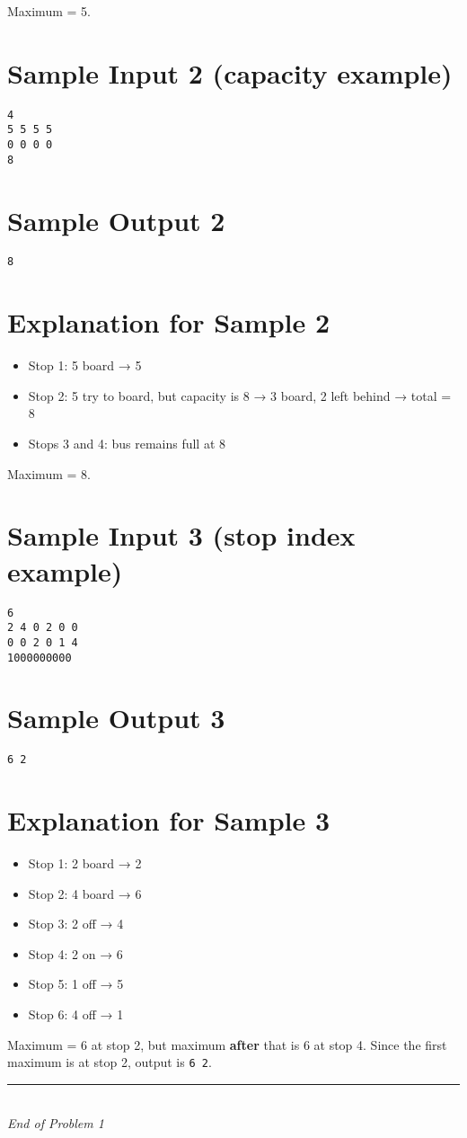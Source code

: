 \documentclass[12pt,a4paper]{article}
\begin{document}
Maximum = 5.

\section*{Sample Input 2 (capacity example)}
\begin{verbatim}
4
5 5 5 5
0 0 0 0
8
\end{verbatim}

\section*{Sample Output 2}
\begin{verbatim}
8
\end{verbatim}

\section*{Explanation for Sample 2}
\begin{itemize}
  \item Stop 1: 5 board → 5  
  \item Stop 2: 5 try to board, but capacity is 8 → 3 board, 2 left behind → total = 8  
  \item Stops 3 and 4: bus remains full at 8  
\end{itemize}

Maximum = 8.

\section*{Sample Input 3 (stop index example)}
\begin{verbatim}
6
2 4 0 2 0 0
0 0 2 0 1 4
1000000000
\end{verbatim}

\section*{Sample Output 3}
\begin{verbatim}
6 2
\end{verbatim}

\section*{Explanation for Sample 3}
\begin{itemize}
  \item Stop 1: 2 board → 2  
  \item Stop 2: 4 board → 6  
  \item Stop 3: 2 off → 4  
  \item Stop 4: 2 on → 6  
  \item Stop 5: 1 off → 5  
  \item Stop 6: 4 off → 1  
\end{itemize}

Maximum = 6 at stop 2, but maximum \textbf{after} that is 6 at stop 4.  
Since the first maximum is at stop 2, output is \texttt{6 2}.  

\vfill
\begin{center}
    \rule{0.8\textwidth}{0.4pt} \\[0.5em]
    \textit{End of Problem 1}
\end{center}
\end{document}
